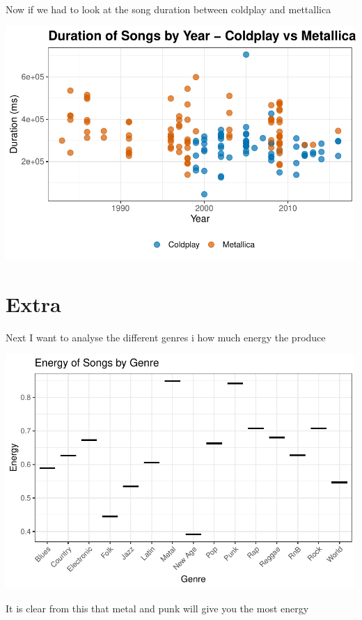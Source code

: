 \documentclass[12pt,preprint, authoryear]{elsarticle}
\let\origfigure\figure
\let\endorigfigure\endfigure
\renewenvironment{figure}[1][2] {
    \expandafter\origfigure\expandafter[H]
} {
    \endorigfigure
}
\numberwithin{equation}{section}
\numberwithin{figure}{section}
\numberwithin{table}{section}
\begin{document}
Now if we had to look at the song duration between coldplay and
mettallica

\begin{figure}[H]

{\centering \includegraphics{Q3_files/figure-latex/Figure7-1} 

}

\caption{Song Duration   \label{Figure7}}\label{fig:Figure7}
\end{figure}

\hypertarget{extra}{%
\section{Extra}\label{extra}}

Next I want to analyse the different genres i how much energy the
produce

\begin{figure}[H]

{\centering \includegraphics{Q3_files/figure-latex/Figure8-1} 

}

\caption{Engergy per Genre  \label{Figure8}}\label{fig:Figure8}
\end{figure}

It is clear from this that metal and punk will give you the most energy


\end{document}
